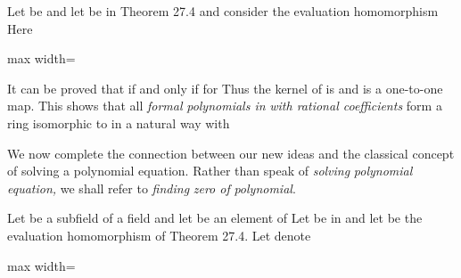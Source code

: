 \documentclass[11pt,oneside]{article}
\begin{document}
\begin{BookBody}

 Let  be  and let  be  in Theorem 27.4 and consider the evaluation homomorphism  Here

\begin{center}\begin{adjustbox}{max width=\linewidth}\end{adjustbox}\end{center}

\noindent It can be proved that  if and only if  for  Thus the kernel of \BookInline{\phi _{\pi }} is  and \BookInline{\phi _{\pi }} is a one-to-one map. This shows that all\textit{ formal} \textit{polynomials in} \BookInline{\pi } \textit{with rational coefficients} form a ring isomorphic to  in a natural way with \BookEnd{\blacktriangle}


\noindent We now complete the connection between our new ideas and the classical concept of solving a polynomial equation. Rather than speak of\textit{ solving}  \textit{polynomial equation,} we shall refer to\textit{ finding}  \textit{zero of}  \textit{polynomial}.

 Let  be a subfield of a field  and let \BookInline{\alpha } be an element of  Let   be in  and let  be the evaluation homomorphism of Theorem 27.4. Let  denote

\begin{center}\begin{adjustbox}{max width=\linewidth}\end{adjustbox}\end{center}


\end{BookBody}
\end{document}
